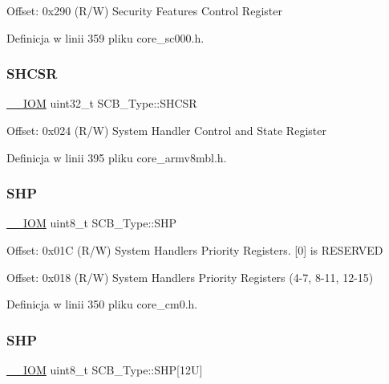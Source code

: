 Offset\+: 0x290 (R/W) Security Features Control Register 

Definicja w linii 359 pliku core\+\_\+sc000.\+h.

\mbox{\label{struct_s_c_b___type_a7b5ae9741a99808043394c4743b635c4}} 
\subsubsection{\texorpdfstring{S\+H\+C\+SR}{SHCSR}}
{\footnotesize\ttfamily \hyperlink{core__sc300_8h_ab6caba5853a60a17e8e04499b52bf691}{\+\_\+\+\_\+\+I\+OM} uint32\+\_\+t S\+C\+B\+\_\+\+Type\+::\+S\+H\+C\+SR}

Offset\+: 0x024 (R/W) System Handler Control and State Register 

Definicja w linii 395 pliku core\+\_\+armv8mbl.\+h.

\mbox{\label{struct_s_c_b___type_a5c40d124f95a3f7f431a3d5409d6ad28}} 
\subsubsection{\texorpdfstring{S\+HP}{SHP}\hspace{0.1cm}{\footnotesize\ttfamily [1/2]}}
{\footnotesize\ttfamily \hyperlink{core__sc300_8h_ab6caba5853a60a17e8e04499b52bf691}{\+\_\+\+\_\+\+I\+OM} uint8\+\_\+t S\+C\+B\+\_\+\+Type\+::\+S\+HP}

Offset\+: 0x01C (R/W) System Handlers Priority Registers. \mbox{[}0\mbox{]} is R\+E\+S\+E\+R\+V\+ED

Offset\+: 0x018 (R/W) System Handlers Priority Registers (4-\/7, 8-\/11, 12-\/15) 

Definicja w linii 350 pliku core\+\_\+cm0.\+h.

\mbox{\label{struct_s_c_b___type_a9b05f74580fc93daa7fe2f0e1c9c5663}} 
\subsubsection{\texorpdfstring{S\+HP}{SHP}\hspace{0.1cm}{\footnotesize\ttfamily [2/2]}}
{\footnotesize\ttfamily \hyperlink{core__sc300_8h_ab6caba5853a60a17e8e04499b52bf691}{\+\_\+\+\_\+\+I\+OM} uint8\+\_\+t S\+C\+B\+\_\+\+Type\+::\+S\+HP\mbox{[}12\+U\mbox{]}}

